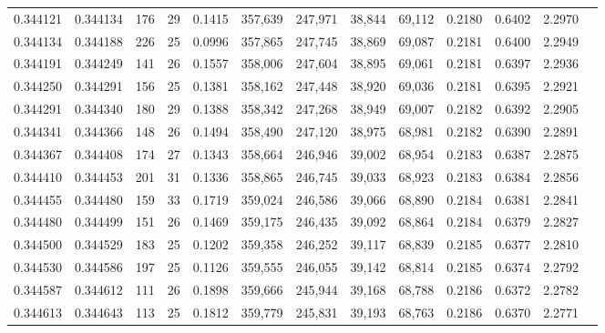 \begin{tabular}{rrrrrrrrrrrrr}
0.344121 & 0.344134 &   176 &  29 &                                     0.1415 & 357,639 & 247,971 &  38,844 &  69,112 & 0.2180 & 0.6402 & 2.2970 \\
0.344134 & 0.344188 &   226 &  25 &                                     0.0996 & 357,865 & 247,745 &  38,869 &  69,087 & 0.2181 & 0.6400 & 2.2949 \\
0.344191 & 0.344249 &   141 &  26 &                                     0.1557 & 358,006 & 247,604 &  38,895 &  69,061 & 0.2181 & 0.6397 & 2.2936 \\
0.344250 & 0.344291 &   156 &  25 &                                     0.1381 & 358,162 & 247,448 &  38,920 &  69,036 & 0.2181 & 0.6395 & 2.2921 \\
0.344291 & 0.344340 &   180 &  29 &                                     0.1388 & 358,342 & 247,268 &  38,949 &  69,007 & 0.2182 & 0.6392 & 2.2905 \\
0.344341 & 0.344366 &   148 &  26 &                                     0.1494 & 358,490 & 247,120 &  38,975 &  68,981 & 0.2182 & 0.6390 & 2.2891 \\
0.344367 & 0.344408 &   174 &  27 &                                     0.1343 & 358,664 & 246,946 &  39,002 &  68,954 & 0.2183 & 0.6387 & 2.2875 \\
0.344410 & 0.344453 &   201 &  31 &                                     0.1336 & 358,865 & 246,745 &  39,033 &  68,923 & 0.2183 & 0.6384 & 2.2856 \\
0.344455 & 0.344480 &   159 &  33 &                                     0.1719 & 359,024 & 246,586 &  39,066 &  68,890 & 0.2184 & 0.6381 & 2.2841 \\
0.344480 & 0.344499 &   151 &  26 &                                     0.1469 & 359,175 & 246,435 &  39,092 &  68,864 & 0.2184 & 0.6379 & 2.2827 \\
0.344500 & 0.344529 &   183 &  25 &                                     0.1202 & 359,358 & 246,252 &  39,117 &  68,839 & 0.2185 & 0.6377 & 2.2810 \\
0.344530 & 0.344586 &   197 &  25 &                                     0.1126 & 359,555 & 246,055 &  39,142 &  68,814 & 0.2185 & 0.6374 & 2.2792 \\
0.344587 & 0.344612 &   111 &  26 &                                     0.1898 & 359,666 & 245,944 &  39,168 &  68,788 & 0.2186 & 0.6372 & 2.2782 \\
0.344613 & 0.344643 &   113 &  25 &                                     0.1812 & 359,779 & 245,831 &  39,193 &  68,763 & 0.2186 & 0.6370 & 2.2771 \\

\end{tabular}
